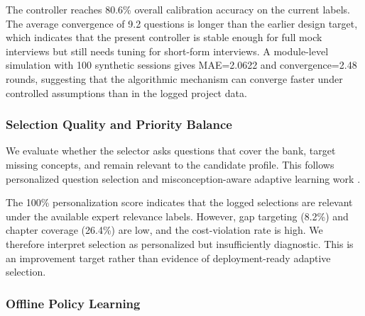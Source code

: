 ﻿\documentclass[final,3p,times,authoryear]{elsarticle}
\begin{document}
\noindent The controller reaches 80.6\% overall calibration accuracy on the current labels. The average convergence of 9.2 questions is longer than the earlier design target, which indicates that the present controller is stable enough for full mock interviews but still needs tuning for short-form interviews. A module-level simulation with 100 synthetic sessions gives MAE=2.0622 and convergence=2.48 rounds, suggesting that the algorithmic mechanism can converge faster under controlled assumptions than in the logged project data.

\subsubsection{Selection Quality and Priority Balance}
\label{sec:results_selection}

\noindent We evaluate whether the selector asks questions that cover the bank, target missing concepts, and remain relevant to the candidate profile. This follows personalized question selection and misconception-aware adaptive learning work \cite{chen2022personalization,verma2025edge}.

\begin{table}[H]
\centering
\caption{State-aware selection metrics. Generated by \texttt{reproduce\_results/calc\_selection.py}.}
\label{tab:selection}
\end{table}

\noindent The 100\% personalization score indicates that the logged selections are relevant under the available expert relevance labels. However, gap targeting (8.2\%) and chapter coverage (26.4\%) are low, and the cost-violation rate is high. We therefore interpret selection as personalized but insufficiently diagnostic. This is an improvement target rather than evidence of deployment-ready adaptive selection.

\subsubsection{Offline Policy Learning}
\end{document}
